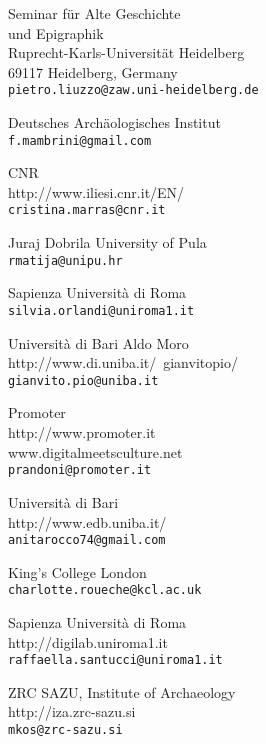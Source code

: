 \begin{contributors}
{Seminar für Alte Geschichte\\ und Epigraphik\\
Ruprecht-Karls-Universität Heidelberg\\
69117 Heidelberg, Germany\\
\texttt{pietro.liuzzo@zaw.uni-heidelberg.de}}


{Deutsches Archäologisches Institut \\
\texttt{f.mambrini@gmail.com}
}


{CNR  \\
{ http://www.iliesi.cnr.it/EN/}	\\
\texttt{cristina.marras@cnr.it		}
}
	

{  Juraj Dobrila University of Pula	 \\
\texttt{rmatija@unipu.hr}
}

{  Sapienza Università di Roma	 \\
\texttt{silvia.orlandi@uniroma1.it}
}
	
			

{ Università di Bari Aldo Moro	  \\
{http://www.di.uniba.it/~gianvitopio/ }\\
\texttt{gianvito.pio@uniba.it}
}

{ Promoter	  \\
{http://www.promoter.it} \\
{ www.digitalmeetsculture.net}	\\
\texttt{prandoni@promoter.it}
}



{  Università di Bari	 \\
{http://www.edb.uniba.it/} \\
\texttt{anitarocco74@gmail.com}
}
			

{ King's College London	  \\
\texttt{charlotte.roueche@kcl.ac.uk	}
}
	

{ Sapienza Università di Roma  \\
{http://digilab.uniroma1.it }\\
\texttt{raffaella.santucci@uniroma1.it	}
}


{  ZRC SAZU, Institute of Archaeology \\
{http://iza.zrc-sazu.si}	\\
\texttt{mkos@zrc-sazu.si	}
}



\end{contributors}
